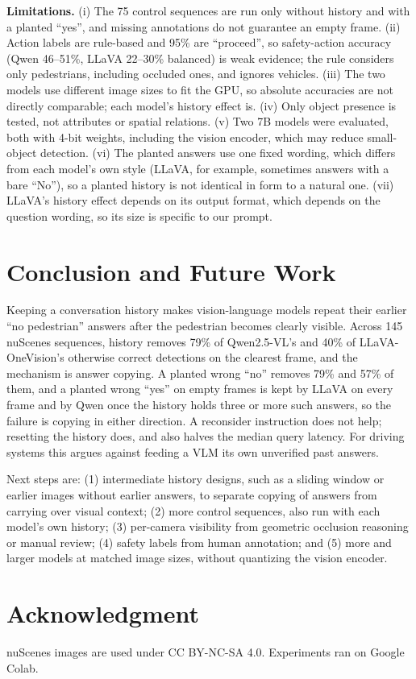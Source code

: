 \documentclass[conference]{IEEEtran}
\begin{document}
\textbf{Limitations.} (i) The 75 control sequences are run only without history and with a planted ``yes'', and missing annotations do not guarantee an empty frame. (ii) Action labels are rule-based and 95\% are ``proceed'', so safety-action accuracy (Qwen 46--51\%, LLaVA 22--30\% balanced) is weak evidence; the rule considers only pedestrians, including occluded ones, and ignores vehicles. (iii) The two models use different image sizes to fit the GPU, so absolute accuracies are not directly comparable; each model's history effect is. (iv) Only object presence is tested, not attributes or spatial relations. (v) Two 7B models were evaluated, both with 4-bit weights, including the vision encoder, which may reduce small-object detection. (vi) The planted answers use one fixed wording, which differs from each model's own style (LLaVA, for example, sometimes answers with a bare ``No''), so a planted history is not identical in form to a natural one. (vii) LLaVA's history effect depends on its output format, which depends on the question wording, so its size is specific to our prompt.

\section{Conclusion and Future Work}

Keeping a conversation history makes vision-language models repeat their earlier ``no pedestrian'' answers after the pedestrian becomes clearly visible. Across 145 nuScenes sequences, history removes 79\% of Qwen2.5-VL's and 40\% of LLaVA-OneVision's otherwise correct detections on the clearest frame, and the mechanism is answer copying. A planted wrong ``no'' removes 79\% and 57\% of them, and a planted wrong ``yes'' on empty frames is kept by LLaVA on every frame and by Qwen once the history holds three or more such answers, so the failure is copying in either direction. A reconsider instruction does not help; resetting the history does, and also halves the median query latency. For driving systems this argues against feeding a VLM its own unverified past answers.

Next steps are: (1) intermediate history designs, such as a sliding window or earlier images without earlier answers, to separate copying of answers from carrying over visual context; (2) more control sequences, also run with each model's own history; (3) per-camera visibility from geometric occlusion reasoning or manual review; (4) safety labels from human annotation; and (5) more and larger models at matched image sizes, without quantizing the vision encoder.

\section*{Acknowledgment}
nuScenes images are used under CC BY-NC-SA 4.0. Experiments ran on Google Colab.



\end{document}
